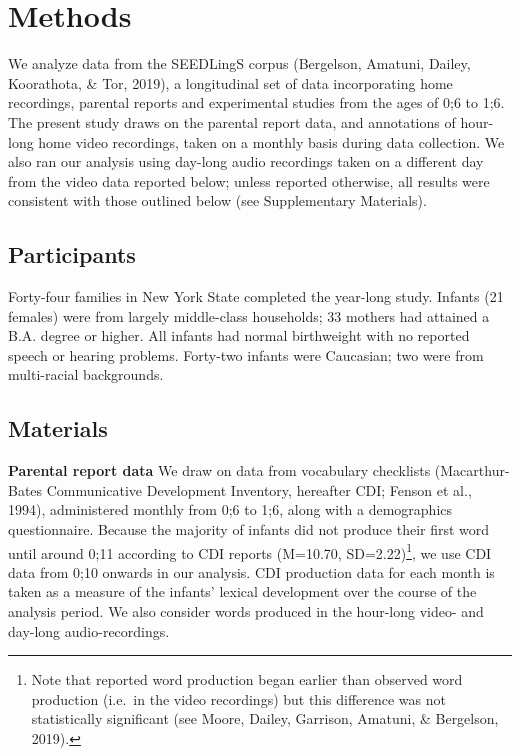 \documentclass[
  english,
  man,floatsintext]{apa6}
\begin{document}
\hypertarget{methods}{%
\section{Methods}\label{methods}}

We analyze data from the SEEDLingS corpus (Bergelson, Amatuni, Dailey, Koorathota, \& Tor, 2019), a longitudinal set of data incorporating home recordings, parental reports and experimental studies from the ages of 0;6 to 1;6. The present study draws on the parental report data, and annotations of hour-long home video recordings, taken on a monthly basis during data collection. We also ran our analysis using day-long audio recordings taken on a different day from the video data reported below; unless reported otherwise, all results were consistent with those outlined below (see Supplementary Materials).

\hypertarget{participants}{%
\subsection{Participants}\label{participants}}

Forty-four families in New York State completed the year-long study. Infants (21 females) were from largely middle-class households; 33 mothers had attained a B.A. degree or higher. All infants had normal birthweight with no reported speech or hearing problems. Forty-two infants were Caucasian; two were from multi-racial backgrounds.

\hypertarget{materials}{%
\subsection{Materials}\label{materials}}

\textbf{Parental report data} We draw on data from vocabulary checklists (Macarthur-Bates Communicative Development Inventory, hereafter CDI; Fenson et al., 1994), administered monthly from 0;6 to 1;6, along with a demographics questionnaire. Because the majority of infants did not produce their first word until around 0;11 according to CDI reports (M=10.70, SD=2.22)\footnote{Note that reported word production began earlier than observed word production (i.e.~in the video recordings) but this difference was not statistically significant (see Moore, Dailey, Garrison, Amatuni, \& Bergelson, 2019).}, we use CDI data from 0;10 onwards in our analysis. CDI production data for each month is taken as a measure of the infants' lexical development over the course of the analysis period. We also consider words produced in the hour-long video- and day-long audio-recordings.
\end{document}
